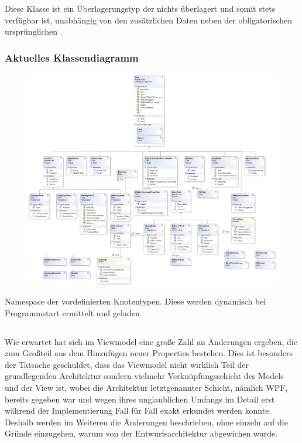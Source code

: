 \paragraph{}~\\
Diese Klasse ist ein Überlagerungstyp der nichts überlagert und somit stets verfügbar ist, unabhängig von den zusätzlichen Daten neben der obligatorischen ursprünglichen .
\newpage

\subsubsection*{Aktuelles Klassendiagramm}
\begin{figure}[h!]
\begin{center}
\includegraphics[width=0.76\textheight,angle=90]{classdiagram/pipe-imp.png}
\end{center}
\end{figure}
Namespace der vordefinierten Knotentypen. Diese werden dynamisch bei Programmstart ermittelt und geladen.
\newpage

\subsection{}

Wie erwartet hat sich im Viewmodel eine große Zahl an Änderungen ergeben, die zum Großteil aus dem Hinzufügen neuer Properties bestehen. Dies ist besonders der Tatsache geschuldet, dass das Viewmodel nicht wirklich Teil der grundlegenden Architektur sondern vielmehr Verknüpfungsschicht des Models und der View ist, wobei die Architektur letztgenannter Schicht, nämlich WPF, bereits gegeben war und wegen ihres unglaublichen Umfangs im Detail erst während der Implementierung Fall für Fall exakt erkundet werden konnte. Deshalb werden im Weiteren die Änderungen beschrieben, ohne einzeln auf die Gründe einzugehen, warum von der Entwurfsarchitektur abgewichen wurde.

